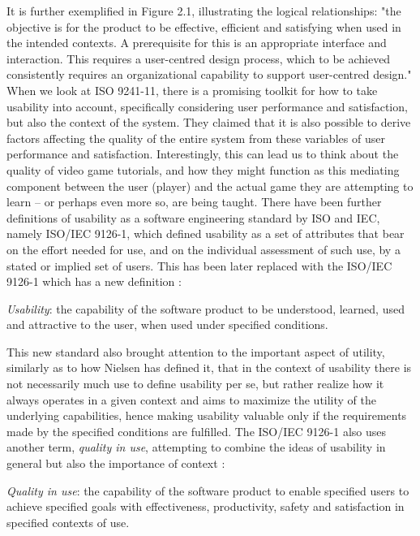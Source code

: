 It is further exemplified in Figure 2.1, illustrating the logical relationships: "the objective is for the product to be effective, efficient and satisfying when used in the intended contexts. A prerequisite for this is an appropriate interface and interaction. This requires a user-centred design process, which to be achieved consistently requires an organizational capability to support user-centred design." \cite{Bevan2006} When we look at ISO 9241-11, there is a promising toolkit for how to take usability into account, specifically considering user performance and satisfaction, but also the context of the system. They claimed that it is also possible to derive factors affecting the quality of the entire system from these variables of user performance and satisfaction. \cite{Bevan2006} Interestingly, this can lead us to think about the quality of video game tutorials, and how they might function as this mediating component between the user (player) and the actual game they are attempting to learn -- or perhaps even more so, are being taught. There have been further definitions of usability as a software engineering standard by ISO and IEC, namely ISO/IEC 9126-1, which defined usability as a set of attributes that bear on the effort needed for use, and on the individual assessment of such use, by a stated or implied set of users. \cite{Bevan2006} This has been later replaced with the ISO/IEC 9126-1 which has a new definition \cite{Bevan2006}:

\begin{displayquote}
	
	\textit{Usability}: the capability of the software product to be understood, learned, used and attractive to the user, when used under specified conditions.
	
\end{displayquote}

This new standard also brought attention to the important aspect of utility, similarly as to how Nielsen has defined it, that in the context of usability there is not necessarily much use to define usability per se, but rather realize how it always operates in a given context and aims to maximize the utility of the underlying capabilities, hence making usability valuable only if the requirements made by the specified conditions are fulfilled. The ISO/IEC 9126-1 also uses another term, \textit{quality in use}, attempting to combine the ideas of usability in general but also the importance of context \cite{Bevan2006}:

\begin{displayquote}
	
	\textit{Quality in use}: the capability of the software product to enable specified users to achieve specified goals with effectiveness, productivity, safety and satisfaction in specified contexts of use.
	
\end{displayquote}

